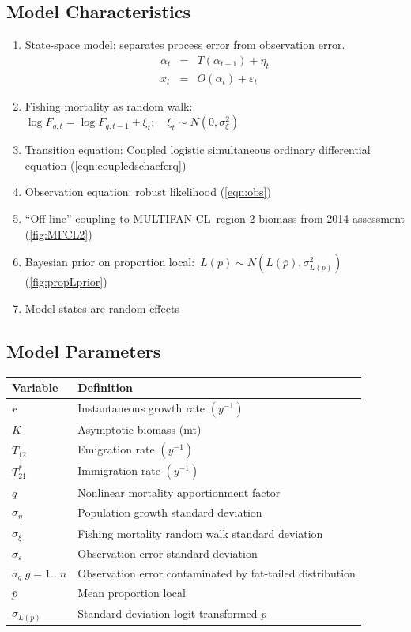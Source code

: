 \documentclass[a4paper,KOMA,landscape,titlepage]{powersem}
\newcommand\MFCL{MULTIFAN-CL}
\begin{document}
\begin{slide}\section{Model Characteristics}
\begin{enumerate}
\item State-space model; separates process error from observation
error.
\begin{eqnarray}
\alpha_t &=&T(\alpha_{t-1}) + \eta_t\\
x_t &=& O(\alpha_t) + \varepsilon_t
\end{eqnarray}
\item Fishing mortality as random walk:~
$\log F_{g,t} = \log F_{g,t-1} + \xi_t;\quad \xi_t\sim
N(0,\sigma^2_\xi)$
\item Transition equation: Coupled logistic simultaneous ordinary
differential equation (\ref{eqn:coupledschaeferq})
\item Observation equation: robust likelihood (\ref{eqn:obs})
\item ``Off-line'' coupling to \MFCL\ region 2 biomass from 2014 assessment
(\ref{fig:MFCL2})
\item Bayesian prior on proportion local:~$L(p)\sim
N(L(\bar{p}),\sigma^2_{L(p)})$
(\ref{fig:propLprior})
\item Model states are random effects
\end{enumerate}
\end{slide}

\begin{slide}\section{Model Parameters}
\begin{center}
\begin{tabular}{ll}
\hline
Variable & Definition\\
\hline
\hline
$r$ & Instantaneous growth rate $(y^{-1})$\\
$K$ & Asymptotic biomass (mt) \\
$T_{12}$ & Emigration rate $(y^{-1})$\\
$T^*_{21}$& Immigration rate $(y^{-1})$\\
$q$ & Nonlinear mortality apportionment factor\\
\hline
$\sigma_\eta$ & Population growth standard deviation\\
$\sigma_\xi$ & Fishing mortality random walk standard deviation\\
$\sigma_\varepsilon$ & Observation error standard deviation \\
$a_g\; g=1\ldots n$ & Observation error contaminated by 
fat-tailed distribution\\
\hline
$\bar{p}$ & Mean proportion local\\
$\sigma_{L(p)}$ & Standard deviation logit transformed $\bar{p}$\\
\hline
\end{tabular}
\end{center}
\end{slide}
\end{document}
